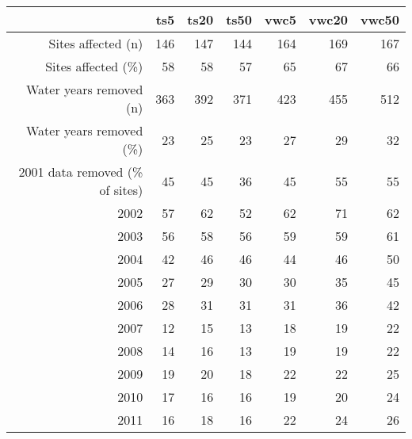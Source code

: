 \begin{table}[ht]
\centering
\begin{tabular}{rrrrrrr}
  \hline
 & ts5 & ts20 & ts50 & vwc5 & vwc20 & vwc50 \\ 
  \hline
Sites affected (n) & 146 & 147 & 144 & 164 & 169 & 167 \\ 
  Sites affected (\%) & 58 & 58 & 57 & 65 & 67 & 66 \\ 
  Water years removed (n) & 363 & 392 & 371 & 423 & 455 & 512 \\ 
  Water years removed (\%) & 23 & 25 & 23 & 27 & 29 & 32 \\ 
  2001 data removed (\% of sites) & 45 & 45 & 36 & 45 & 55 & 55 \\ 
  2002 & 57 & 62 & 52 & 62 & 71 & 62 \\ 
  2003 & 56 & 58 & 56 & 59 & 59 & 61 \\ 
  2004 & 42 & 46 & 46 & 44 & 46 & 50 \\ 
  2005 & 27 & 29 & 30 & 30 & 35 & 45 \\ 
  2006 & 28 & 31 & 31 & 31 & 36 & 42 \\ 
  2007 & 12 & 15 & 13 & 18 & 19 & 22 \\ 
  2008 & 14 & 16 & 13 & 19 & 19 & 22 \\ 
  2009 & 19 & 20 & 18 & 22 & 22 & 25 \\ 
  2010 & 17 & 16 & 16 & 19 & 20 & 24 \\ 
  2011 & 16 & 18 & 16 & 22 & 24 & 26 \\ 
   \hline
\end{tabular}
\end{table}
